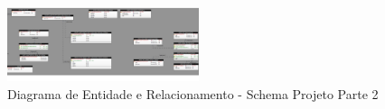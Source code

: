 \documentclass{acm_proc_article-sp}
\begin{document}
\begin{appendices}
\begin{figure}[h]
\centering %
\includegraphics[width=0.5\textwidth]{DER_projeto_p2.jpg} %
\caption{Diagrama de Entidade e Relacionamento - Schema Projeto Parte 2}
\end{figure}



\end{appendices}
\end{document}
